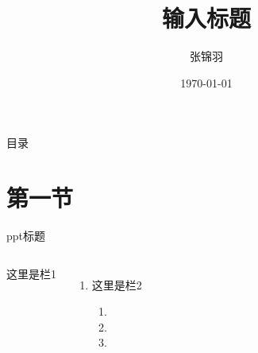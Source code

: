 \documentclass[10pt]{beamer}
\title{输入标题}
\date{\today}%
\author{张锦羽}
\institute{西安交通大学管理学院} %
\begin{document}
\begin{frame}
\titlepage
    
\end{frame}
\begin{frame}{目录}
    \tableofcontents 
\end{frame}
\section{第一节}
\begin{frame}{ppt标题}
    \begin{columns}
        这里是栏1
        
        \begin{enumerate}
            \item 这里是栏2
                \begin{enumerate}
                    \item 
                    \item 
                    \item 
                \end{enumerate}
        \end{enumerate}
    \end{columns}
\end{frame}
\end{document}
